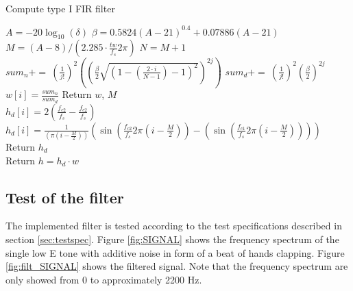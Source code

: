 \begin{algorithm}[H]
\caption{Compute type I FIR filter}
\label{alg:FIR}
\begin{algorithmic}[1] 
\State $A=-20\log_{10}(\delta)$ 
\State $\beta = 0.5824(A-21)^{0.4} + 0.07886(A-21)$ 
\State $M = (A-8)/(2.285 \cdot \frac{tw}{f_s} 2\pi)$ 
\State $N = M+1$ 
			\State $ sum_n + = \ (\frac{1}{j!})^2 \left( \left( \frac{\beta}{2} \sqrt{\left(1 - \left( \frac{2 \cdot i}{N-1}\right) - 1\right)^2}\right)^{2j}\right)$
			\State $ sum_d + = \ (\frac{1}{j!})^2 \left( \frac{\beta}{2}\right)^{2j}$
		\EndFor
		\State $w[i]=\frac{sum_n}{sum_d}$
	\EndFor
	\State Return $w$, $M$
\EndProcedure
\\
        		\State $h_d[i] = 2( \frac{f_{c2}}{f_s} - \frac{f_{c2}}{f_s})$
        	\Else 
        		\State  $h_d[i] = \frac{1}{ (\pi (i - \frac{M}{2}))}(\sin(\frac{f_{c2}}{f_s} 2 \pi (i - \frac{M}{2})) - (\sin(\frac{f_{c1}}{f_s} 2 \pi (i - \frac{M}{2}))))$ 
          	\EndIf 
  	\EndFor
  	\State Return $h_d$
\EndProcedure
\\
	\State Return $h = h_d \cdot w$ 
\EndProcedure


\end{algorithmic}
\end{algorithm}

\subsection{Test of the filter}
The implemented filter is tested according to the test specifications described in section \ref{sec:testspec}. Figure \ref{fig:SIGNAL} shows the frequency spectrum of the single low E tone with additive noise in form of a beat of hands clapping. Figure \ref{fig:filt_SIGNAL} shows the filtered signal. Note that the frequency spectrum are only showed from 0 to approximately 2200 Hz.  

